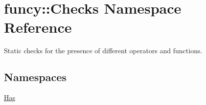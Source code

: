 \hypertarget{namespacefuncy_1_1Checks}{\section{funcy\-:\-:Checks Namespace Reference}
\label{namespacefuncy_1_1Checks}
}


Static checks for the presence of different operators and functions.  


\subsection*{Namespaces}
\begin{DoxyCompactItemize}
\item 
\hyperlink{namespacefuncy_1_1Checks_1_1Has}{Has}
\end{DoxyCompactItemize}

